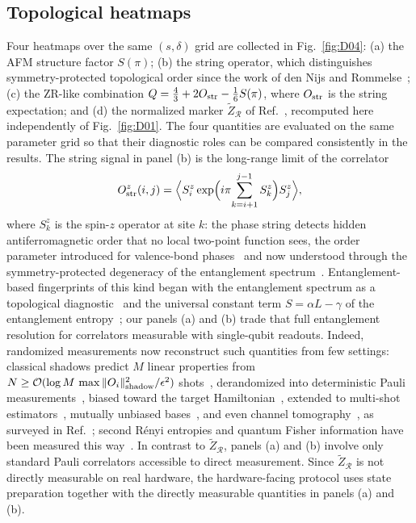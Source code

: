 \subsection{Topological heatmaps}
\label{sec:heatmaps}

Four heatmaps over the same $(s,\delta)$
grid are collected in Fig.~\ref{fig:D04}: (a) the AFM structure factor $S(\pi)$; (b) the string operator,
which distinguishes symmetry-protected topological order since the
work of den Nijs and Rommelse~\cite{dennijs1989preroughening};
(c) the ZR-like combination $Q=\frac{4}{3}+2O_{\rm str}-\frac{1}{6}S(\pi)$,
where $O_{\rm str}$ is the string expectation; and
(d) the normalized marker $\tilde{Z}_{\mathcal R}$ of
Ref.~\cite{elben2020manybody}, recomputed here independently of Fig.~\ref{fig:D01}.
The four quantities are evaluated on the same parameter grid so that
their diagnostic roles can be compared consistently in the results.
The string signal in panel (b) is the long-range limit of the correlator
\begin{equation}
O^z_{\rm str}(i,j)=\Big\langle S^z_i\exp\!\Big(i\pi\!\sum_{k=i+1}^{j-1}S^z_k\Big)S^z_j\Big\rangle,
\end{equation}
where $S^z_k$ is the spin-$z$ operator at site $k$: the phase string
detects hidden antiferromagnetic order that no local two-point function
sees, the order parameter introduced for valence-bond
phases~\cite{dennijs1989preroughening} and now understood through the
symmetry-protected degeneracy of the entanglement
spectrum~\cite{pollmann2010entanglement}.
Entanglement-based fingerprints of this kind began with the
entanglement spectrum as a topological diagnostic~\cite{li2008entanglement}
and the universal constant term $S=\alpha L-\gamma$ of the entanglement
entropy~\cite{kitaev2006topological,levin2006detecting}; our panels (a)
and (b) trade that full entanglement resolution for correlators
measurable with single-qubit readouts.
Indeed, randomized measurements now reconstruct such quantities from
few settings: classical shadows predict $M$ linear properties from
$N\ge{\cal O}(\log M\,\max\|O_i\|^2_{\rm shadow}/\epsilon^2)$
shots~\cite{huang2020predicting}, derandomized into deterministic Pauli
measurements~\cite{huang2021derandomization}, biased toward the target
Hamiltonian~\cite{hadfield2022measurements}, extended to multi-shot
estimators~\cite{zhou2023performance}, mutually unbiased
bases~\cite{wang2023classical}, and even channel
tomography~\cite{kunjummen2023shadow}, as
surveyed in Ref.~\cite{elben2022toolbox}; second R\'enyi entropies and
quantum Fisher information have been measured this
way~\cite{brydges2019probing,vitale2024robust}.
In contrast to $\tilde{Z}_{\mathcal R}$, panels (a) and (b) involve only
standard Pauli correlators accessible to direct measurement.
Since $\tilde{Z}_{\mathcal R}$ is not directly measurable on real
hardware, the hardware-facing protocol uses state preparation together
with the directly measurable quantities in panels (a) and (b).

